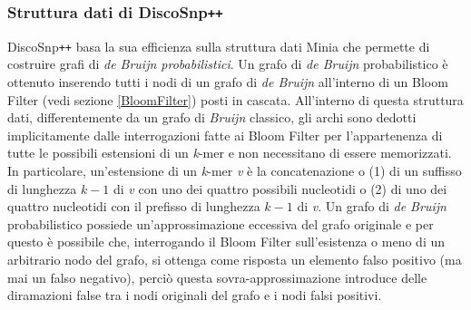 \documentclass[../main.tex]{subfiles}
\begin{document}
%
%
%
%
%
%


\subsubsection{Struttura dati di DiscoSnp\texttt{++}}
\label{dBG_prob}

DiscoSnp\texttt{++} basa la sua efficienza sulla struttura dati Minia \cite{chikhi2013space} che permette di costruire grafi di \textit{de Bruijn probabilistici}. Un grafo di \textit{de Bruijn} probabilistico è ottenuto inserendo tutti i nodi di un grafo di \textit{de Bruijn} all'interno di un Bloom Filter (vedi sezione \ref{BloomFilter}) posti in cascata. All'interno di questa struttura dati, differentemente da un grafo di \textit{Bruijn} classico, gli archi sono dedotti implicitamente dalle interrogazioni fatte ai Bloom Filter per l'appartenenza di tutte le possibili estensioni di un \textit{k}-mer e non necessitano di essere memorizzati. In particolare, un'estensione di un \textit{k}-mer \textit{v} è la concatenazione o (1) di un suffisso di lunghezza $k-1$ di \textit{v} con uno dei quattro possibili nucleotidi o (2) di uno dei quattro nucleotidi con il prefisso di lunghezza $k-1$ di \textit{v}. Un grafo di \textit{de Bruijn} probabilistico possiede un'approssimazione eccessiva del grafo originale e per questo è possibile che, interrogando il Bloom Filter sull'esistenza o meno di un arbitrario nodo del grafo, si ottenga come risposta un elemento falso positivo (ma mai un falso negativo), perciò questa sovra-approssimazione introduce delle diramazioni false tra i nodi originali del grafo e i nodi falsi positivi.
\end{document}
